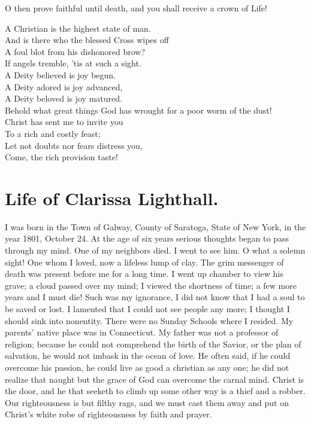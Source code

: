\documentclass{article}
\renewcommand\footnote[1]{} %
\begin{document}
O then prove faithful until death, and you shall receive a crown of Life!
\begin{center}
A Christian is the highest state of man.\\
And is there who the blessed Cross wipes off\\
A foul blot from his dishonored brow?\\
If angels tremble, 'tis at such a sight.\\
A Deity believed is joy begun.\\
A Deity adored is joy advanced,\\
A Deity beloved is joy matured.\\
Behold what great things God has wrought for a poor worm of the dust!\\
Christ has sent me to invite you\\
To a rich and costly feast;\\
Let not doubts nor fears distress you,\\
Come, the rich provision taste!
\end{center}

\section*{Life of Clarissa Lighthall.}
I was born in the Town of Galway, County of Saratoga, State of New York, in the year 1801, October 24.
At the age of six years\footnote{in the year 1807} serious thoughts began to pass through my mind.
One of my neighbors died.
I went to see him.
O what a solemn sight!
One whom I loved, now a lifeless lump of clay.
The grim messenger of death was present before me for a long time.
I went up chamber to view his grave; a cloud passed over my mind; I viewed the shortness of time; a few more years and I must die!
Such was my ignorance, I did not know that I had a soul to be saved or lost.
I lamented that I could not see people any more; I thought I should sink into nonentity.
There were no Sunday Schools where I resided.
My parents' native place was in Connecticut.
My father\footnote{Gideon Draper, 1769--1850} was not a professor of religion; because he could not comprehend the birth of the Savior, or the plan of salvation, he would not imbask in the ocean of love.
He often said, if he could overcome his passion, he could live as good a christian as any one; he did not realize that naught but the grace of God can overcome the carnal mind.
Christ is the door, and he that seeketh to climb up some other way is a thief and a robber.
Our righteousness is but filthy rags, and we must cast them away and put on Christ's white robe of righteousness by faith and prayer.
\end{document}
